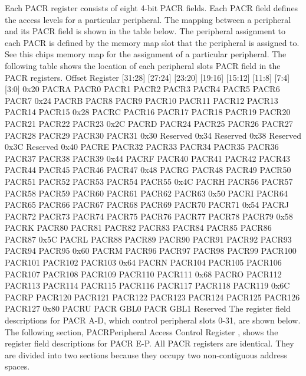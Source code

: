 Each P\+A\+CR register consists of eight 4-\/bit P\+A\+CR fields. Each P\+A\+CR field defines the access levels for a particular peripheral. The mapping between a peripheral and its P\+A\+CR field is shown in the table below. The peripheral assignment to each P\+A\+CR is defined by the memory map slot that the peripheral is assigned to. See this chip\textquotesingle{}s memory map for the assignment of a particular peripheral. The following table shows the location of each peripheral slot\textquotesingle{}s P\+A\+CR field in the P\+A\+CR registers. Offset Register \mbox{[}31\+:28\mbox{]} \mbox{[}27\+:24\mbox{]} \mbox{[}23\+:20\mbox{]} \mbox{[}19\+:16\mbox{]} \mbox{[}15\+:12\mbox{]} \mbox{[}11\+:8\mbox{]} \mbox{[}7\+:4\mbox{]} \mbox{[}3\+:0\mbox{]} 0x20 P\+A\+C\+RA P\+A\+C\+R0 P\+A\+C\+R1 P\+A\+C\+R2 P\+A\+C\+R3 P\+A\+C\+R4 P\+A\+C\+R5 P\+A\+C\+R6 P\+A\+C\+R7 0x24 P\+A\+C\+RB P\+A\+C\+R8 P\+A\+C\+R9 P\+A\+C\+R10 P\+A\+C\+R11 P\+A\+C\+R12 P\+A\+C\+R13 P\+A\+C\+R14 P\+A\+C\+R15 0x28 P\+A\+C\+RC P\+A\+C\+R16 P\+A\+C\+R17 P\+A\+C\+R18 P\+A\+C\+R19 P\+A\+C\+R20 P\+A\+C\+R21 P\+A\+C\+R22 P\+A\+C\+R23 0x2C P\+A\+C\+RD P\+A\+C\+R24 P\+A\+C\+R25 P\+A\+C\+R26 P\+A\+C\+R27 P\+A\+C\+R28 P\+A\+C\+R29 P\+A\+C\+R30 P\+A\+C\+R31 0x30 Reserved 0x34 Reserved 0x38 Reserved 0x3C Reserved 0x40 P\+A\+C\+RE P\+A\+C\+R32 P\+A\+C\+R33 P\+A\+C\+R34 P\+A\+C\+R35 P\+A\+C\+R36 P\+A\+C\+R37 P\+A\+C\+R38 P\+A\+C\+R39 0x44 P\+A\+C\+RF P\+A\+C\+R40 P\+A\+C\+R41 P\+A\+C\+R42 P\+A\+C\+R43 P\+A\+C\+R44 P\+A\+C\+R45 P\+A\+C\+R46 P\+A\+C\+R47 0x48 P\+A\+C\+RG P\+A\+C\+R48 P\+A\+C\+R49 P\+A\+C\+R50 P\+A\+C\+R51 P\+A\+C\+R52 P\+A\+C\+R53 P\+A\+C\+R54 P\+A\+C\+R55 0x4C P\+A\+C\+RH P\+A\+C\+R56 P\+A\+C\+R57 P\+A\+C\+R58 P\+A\+C\+R59 P\+A\+C\+R60 P\+A\+C\+R61 P\+A\+C\+R62 P\+A\+C\+R63 0x50 P\+A\+C\+RI P\+A\+C\+R64 P\+A\+C\+R65 P\+A\+C\+R66 P\+A\+C\+R67 P\+A\+C\+R68 P\+A\+C\+R69 P\+A\+C\+R70 P\+A\+C\+R71 0x54 P\+A\+C\+RJ P\+A\+C\+R72 P\+A\+C\+R73 P\+A\+C\+R74 P\+A\+C\+R75 P\+A\+C\+R76 P\+A\+C\+R77 P\+A\+C\+R78 P\+A\+C\+R79 0x58 P\+A\+C\+RK P\+A\+C\+R80 P\+A\+C\+R81 P\+A\+C\+R82 P\+A\+C\+R83 P\+A\+C\+R84 P\+A\+C\+R85 P\+A\+C\+R86 P\+A\+C\+R87 0x5C P\+A\+C\+RL P\+A\+C\+R88 P\+A\+C\+R89 P\+A\+C\+R90 P\+A\+C\+R91 P\+A\+C\+R92 P\+A\+C\+R93 P\+A\+C\+R94 P\+A\+C\+R95 0x60 P\+A\+C\+RM P\+A\+C\+R96 P\+A\+C\+R97 P\+A\+C\+R98 P\+A\+C\+R99 P\+A\+C\+R100 P\+A\+C\+R101 P\+A\+C\+R102 P\+A\+C\+R103 0x64 P\+A\+C\+RN P\+A\+C\+R104 P\+A\+C\+R105 P\+A\+C\+R106 P\+A\+C\+R107 P\+A\+C\+R108 P\+A\+C\+R109 P\+A\+C\+R110 P\+A\+C\+R111 0x68 P\+A\+C\+RO P\+A\+C\+R112 P\+A\+C\+R113 P\+A\+C\+R114 P\+A\+C\+R115 P\+A\+C\+R116 P\+A\+C\+R117 P\+A\+C\+R118 P\+A\+C\+R119 0x6C P\+A\+C\+RP P\+A\+C\+R120 P\+A\+C\+R121 P\+A\+C\+R122 P\+A\+C\+R123 P\+A\+C\+R124 P\+A\+C\+R125 P\+A\+C\+R126 P\+A\+C\+R127 0x80 P\+A\+C\+RU P\+A\+CR G\+B\+L0 P\+A\+CR G\+B\+L1 Reserved The register field descriptions for P\+A\+CR A-\/D, which control peripheral slots 0-\/31, are shown below. The following section, P\+A\+C\+R\+Peripheral Access Control Register , shows the register field descriptions for P\+A\+CR E-\/P. All P\+A\+CR registers are identical. They are divided into two sections because they occupy two non-\/contiguous address spaces. 

